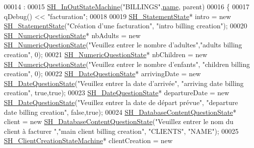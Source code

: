 \begin{DoxyCode}
00014                                                                                             :
00015     \hyperlink{classSH__InOutStateMachine_abd780037922920c674b43d80c2b50d16}{SH\_InOutStateMachine}(\textcolor{stringliteral}{"BILLINGS"},\hyperlink{classSH__NamedObject_a9f686c6f2a5bcc08ad03d0cee0151f0f}{name}, parent)
00016 \{
00017     qDebug() << \textcolor{stringliteral}{"facturation"};
00018 
00019     \hyperlink{classSH__StatementState}{SH\_StatementState}* intro = \textcolor{keyword}{new} \hyperlink{classSH__StatementState}{SH\_StatementState}(\textcolor{stringliteral}{"Création d'une
       facturation"}, \textcolor{stringliteral}{"intro billing creation"});
00020     \hyperlink{classSH__NumericQuestionState}{SH\_NumericQuestionState}* nbAdults = \textcolor{keyword}{new} 
      \hyperlink{classSH__NumericQuestionState}{SH\_NumericQuestionState}(\textcolor{stringliteral}{"Veuillez entrer le nombre d'adultes"},\textcolor{stringliteral}{"adults billing
       creation"}, 0);
00021     \hyperlink{classSH__NumericQuestionState}{SH\_NumericQuestionState}* nbChildren = \textcolor{keyword}{new} 
      \hyperlink{classSH__NumericQuestionState}{SH\_NumericQuestionState}(\textcolor{stringliteral}{"Veuillez entrer le nombre d'enfants"}, \textcolor{stringliteral}{"children billing
       creation"}, 0);
00022     \hyperlink{classSH__DateQuestionState}{SH\_DateQuestionState}* arrivingDate = \textcolor{keyword}{new} 
      \hyperlink{classSH__DateQuestionState}{SH\_DateQuestionState}(\textcolor{stringliteral}{"Veuillez entrer la date d'arrivée"}, \textcolor{stringliteral}{"arriving date billing
       creation"}, \textcolor{keyword}{true},\textcolor{keyword}{true});
00023     \hyperlink{classSH__DateQuestionState}{SH\_DateQuestionState}* departureDate = \textcolor{keyword}{new} 
      \hyperlink{classSH__DateQuestionState}{SH\_DateQuestionState}(\textcolor{stringliteral}{"Veuillez entrer la date de départ prévue"}, \textcolor{stringliteral}{"departure date
       billing creation"}, \textcolor{keyword}{false},\textcolor{keyword}{true});
00024     \hyperlink{classSH__DatabaseContentQuestionState}{SH\_DatabaseContentQuestionState}* client = \textcolor{keyword}{new} 
      \hyperlink{classSH__DatabaseContentQuestionState}{SH\_DatabaseContentQuestionState}(\textcolor{stringliteral}{"Veuillez entrer le nom du client à facturer
      "},\textcolor{stringliteral}{"main client billing creation"}, \textcolor{stringliteral}{"CLIENTS"}, \textcolor{stringliteral}{"NAME"});
00025     \hyperlink{classSH__ClientCreationStateMachine}{SH\_ClientCreationStateMachine}* clientCreation = \textcolor{keyword}{new} 

\end{DoxyCode}
